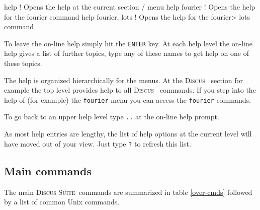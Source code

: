 \documentclass[11pt]{report}
\newcommand{\Discus}{\textsc{Discus\ }}
\newcommand{\Suite}{\textsc{Discus Suite\ }}
\begin{document}
\begin{MacVerbatim}
help               ! Opens the help at the current section / menu
help fourier       ! Opens the help for the fourier command
help fourier, lots ! Opens the help for the fourier> lots command
\end{MacVerbatim}

To leave the on-line help simply hit the {\tt ENTER} key. At each 
help level the on-line help gives a list of further topics, type
any of these names to get help on one of these topics. 

The help is organized hierarchically for the menus. At the \Discus
section for example the top level provides help to all \Discus
commands. If you step into the help of (for example) the 
{\tt fourier} menu you can access the {\tt fourier} commands. 

To go back to an upper help level type {\tt ..} at the 
on-line help prompt.

As most help entries are lengthy, the list of help options at
the current level will have moved out of your view. Just type
{\tt ?} to refresh this list.

\subsection{Main commands} \label{over-main}

The main \Suite commands are summarized in table \ref{over-cmds}
followed by a list of common Unix commands.
\end{document}
